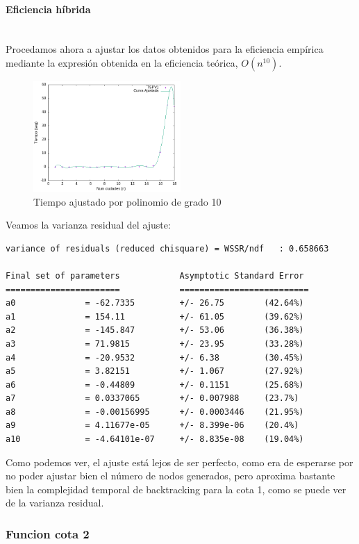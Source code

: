 \documentclass{article}
\newcommand{\myparagraph}[1]{\paragraph{#1}\mbox{}\\}
\begin{document}
\myparagraph{Eficiencia híbrida}

Procedamos ahora a ajustar los datos obtenidos para la eficiencia empírica mediante la expresión obtenida en la eficiencia teórica, $O(n^{10})$.

\begin{figure}[!hbt]
    \centering
    \includegraphics[width=0.5\textwidth]{imagenes/cota1/ef_bk/ef_ajustada_n10.png}
    \caption{Tiempo ajustado por polinomio de grado 10}
    \label{fig:enter-label}
\end{figure}

Veamos la varianza residual del ajuste:

\begin{lstlisting}[numbers=none]
variance of residuals (reduced chisquare) = WSSR/ndf   : 0.658663

Final set of parameters            Asymptotic Standard Error
=======================            ==========================
a0              = -62.7335         +/- 26.75        (42.64%)
a1              = 154.11           +/- 61.05        (39.62%)
a2              = -145.847         +/- 53.06        (36.38%)
a3              = 71.9815          +/- 23.95        (33.28%)
a4              = -20.9532         +/- 6.38         (30.45%)
a5              = 3.82151          +/- 1.067        (27.92%)
a6              = -0.44809         +/- 0.1151       (25.68%)
a7              = 0.0337065        +/- 0.007988     (23.7%)
a8              = -0.00156995      +/- 0.0003446    (21.95%)
a9              = 4.11677e-05      +/- 8.399e-06    (20.4%)
a10             = -4.64101e-07     +/- 8.835e-08    (19.04%)

\end{lstlisting}

Como podemos ver, el ajuste está lejos de ser perfecto, como era de esperarse por no poder ajustar bien el número de nodos generados, pero aproxima bastante bien la complejidad temporal de backtracking para la cota 1, como se puede ver de la varianza residual.

\subsubsection{Funcion cota 2}
\end{document}
